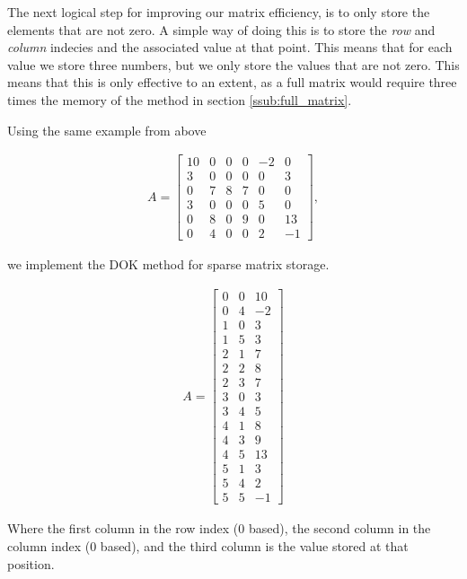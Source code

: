 \documentclass[../fem.tex]{subfiles}
\begin{document}
The next logical step for improving our matrix efficiency, is to only store the
elements that are not zero. A simple way of doing this is to store the
\textit{row} and \textit{column} indecies and the associated value at that
point. This means that for each value we store three numbers, but we only store
the values that are not zero. This means that this is only effective to an
extent, as a full matrix would require three times the memory of the method in
section \ref{ssub:full_matrix}.

Using the same example from above

\begin{align*}
  A = \begin{bmatrix}
    10 & 0 & 0 & 0 & -2 & 0 \\
    3 & 0 & 0 & 0 & 0 & 3 \\
    0 & 7 & 8 & 7 & 0 & 0 \\
    3 & 0 & 0 & 0 & 5 & 0 \\
    0 & 8 & 0 & 9 & 0 & 13 \\
    0 & 4 & 0 & 0 & 2 & -1
  \end{bmatrix},
\end{align*}

we implement the DOK method for sparse matrix storage.

\begin{align*}
  A = \begin{bmatrix}
    0 & 0 & 10 \\
    0 & 4 & -2 \\
    1 & 0 & 3 \\
    1 & 5 & 3 \\
    2 & 1 & 7 \\
    2 & 2 & 8 \\
    2 & 3 & 7 \\
    3 & 0 & 3 \\
    3 & 4 & 5 \\
    4 & 1 & 8 \\
    4 & 3 & 9 \\
    4 & 5 & 13 \\
    5 & 1 & 3 \\
    5 & 4 & 2 \\
    5 & 5 & -1
  \end{bmatrix}
\end{align*}

Where the first column in the row index ($0$ based), the second column in the
column index ($0$ based), and the third column is the value stored at that
position.
\end{document}
